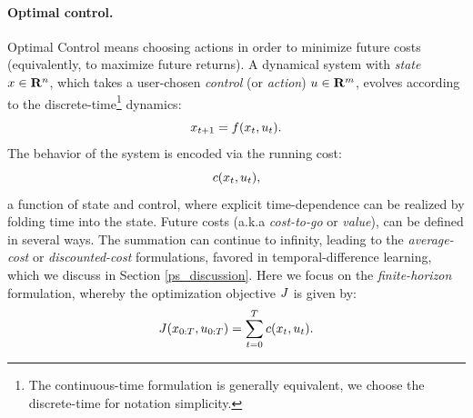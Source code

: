 \paragraph{Optimal control.}
Optimal Control means choosing actions in order to minimize future costs (equivalently, to maximize future returns). A dynamical system with \emph{state} ${x} \in \mathbf{R}^n$, which takes a user-chosen \emph{control} (or \emph{action}) ${u} \in \mathbf{R}^m$, evolves according to the discrete-time\footnote{The continuous-time formulation is generally equivalent, we choose the discrete-time for notation simplicity.} dynamics:
\begin{equation}
	{x}_{t+1} = f({x}_t, {u}_t). 
	\label{ps_dynamics}
\end{equation}
The behavior of the system is encoded via the running cost:
\begin{equation}
	{c}({x}_t, {u}_t),
\end{equation}
a function of state and control, where explicit time-dependence can be realized by folding time into the state. Future costs (a.k.a \emph{cost-to-go} or \emph{value}), can be defined in several ways. The summation can continue to infinity, leading to the \emph{average-cost} or \emph{discounted-cost} formulations, favored in temporal-difference learning, which we discuss in Section \ref{ps_discussion}. Here we focus on the \emph{finite-horizon} formulation, whereby the optimization objective ${J}$ is given by:
\begin{equation}
	{J}({x}_{0:T}, {u}_{0:T}) = \sum_{t=0}^{T} {c}({x}_t, {u}_t). \label{ps_objective}
\end{equation}

